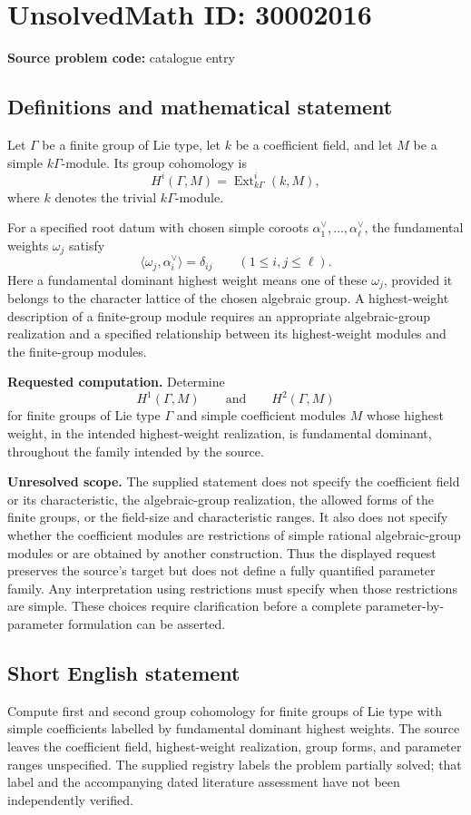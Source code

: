 \documentclass[11pt]{article}
\begin{document}
\section*{UnsolvedMath ID: 30002016}
\textbf{Source problem code:} catalogue entry
\subsection{Definitions and mathematical statement}
Let \(\Gamma\) be a finite group of Lie type, let \(k\) be a coefficient field, and let \(M\) be a simple \(k\Gamma\)-module. Its group cohomology is
\[
H^i(\Gamma,M)=\operatorname{Ext}^i_{k\Gamma}(k,M),
\]
where \(k\) denotes the trivial \(k\Gamma\)-module.

For a specified root datum with chosen simple coroots \(\alpha_1^\vee,\ldots,\alpha_\ell^\vee\), the fundamental weights \(\omega_j\) satisfy
\[
\langle\omega_j,\alpha_i^\vee\rangle=\delta_{ij}
\qquad(1\leq i,j\leq\ell).
\]
Here a fundamental dominant highest weight means one of these \(\omega_j\), provided it belongs to the character lattice of the chosen algebraic group. A highest-weight description of a finite-group module requires an appropriate algebraic-group realization and a specified relationship between its highest-weight modules and the finite-group modules.

\textbf{Requested computation.} Determine
\[
H^1(\Gamma,M)\qquad\text{and}\qquad H^2(\Gamma,M)
\]
for finite groups of Lie type \(\Gamma\) and simple coefficient modules \(M\) whose highest weight, in the intended highest-weight realization, is fundamental dominant, throughout the family intended by the source.

\textbf{Unresolved scope.} The supplied statement does not specify the coefficient field or its characteristic, the algebraic-group realization, the allowed forms of the finite groups, or the field-size and characteristic ranges. It also does not specify whether the coefficient modules are restrictions of simple rational algebraic-group modules or are obtained by another construction. Thus the displayed request preserves the source's target but does not define a fully quantified parameter family. Any interpretation using restrictions must specify when those restrictions are simple. These choices require clarification before a complete parameter-by-parameter formulation can be asserted.
\subsection{Short English statement}
Compute first and second group cohomology for finite groups of Lie type with simple coefficients labelled by fundamental dominant highest weights. The source leaves the coefficient field, highest-weight realization, group forms, and parameter ranges unspecified. The supplied registry labels the problem partially solved; that label and the accompanying dated literature assessment have not been independently verified.
\end{document}
